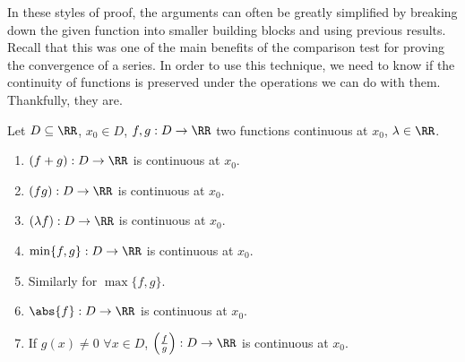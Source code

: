 \documentclass[../real_analysis.tex]{subfiles}
\begin{document}
        In these styles of proof, the arguments can often be greatly simplified by breaking down the given function into smaller building blocks and using previous results. Recall that this was one of the main benefits of the comparison test for proving the convergence of a series. In order to use this technique, we need to know if the continuity of functions is preserved under the operations we can do with them. Thankfully, they are.
        \begin{theorem}\label{cts-func-props}
            Let $D\subseteq\RR$, $x_0\in D$, $f, g: D\to\RR$ two functions continuous at $x_0$, $\lambda\in\RR$.
            \begin{enumerate}[label={\upshape(\roman*)}]
                \item $(f+g): D\to\RR$ is continuous at $x_0$.
                \item $(fg): D\to\RR$ is continuous at $x_0$.
                \item $(\lambda f): D\to\RR$ is continuous at $x_0$.
                \item $\min\{f, g\}: D\to\RR$ is continuous at $x_0$.
                \item Similarly for $\max\{f, g\}$.
                \item $\abs{f}: D\to\RR$ is continuous at $x_0$.
                \item If $g(x)\neq0$ $\forall x\in D$, $\left(\frac{f}{g}\right): D\to\RR$ is continuous at $x_0$.
            \end{enumerate}
        \end{theorem}
\end{document}
